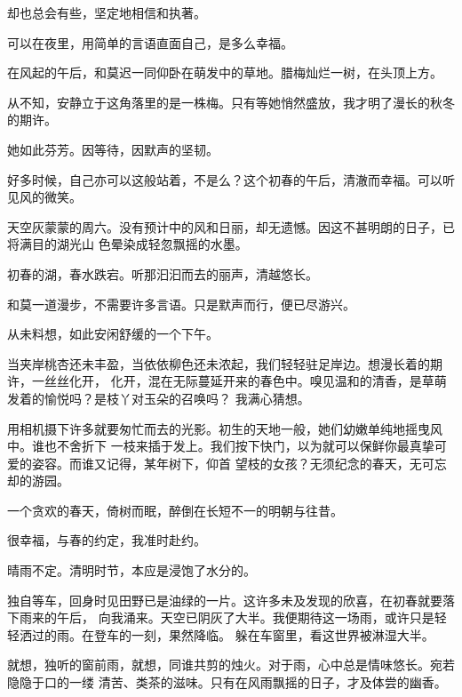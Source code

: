 		却也总会有些，坚定地相信和执著。

	\endwriting



		可以在夜里，用简单的言语直面自己，是多么幸福。

		在风起的午后，和莫迟一同仰卧在萌发中的草地。腊梅灿烂一树，在头顶上方。

		从不知，安静立于这角落里的是一株梅。只有等她悄然盛放，我才明了漫长的秋冬的期许。

		她如此芬芳。因等待，因默声的坚韧。

		好多时候，自己亦可以这般站着，不是么？这个初春的午后，清澈而幸福。可以听见风的微笑。

	\endwriting



		天空灰蒙蒙的周六。没有预计中的风和日丽，却无遗憾。因这不甚明朗的日子，已将满目的湖光山
	色晕染成轻忽飘摇的水墨。

		初春的湖，春水跌宕。听那汩汩而去的丽声，清越悠长。

		和莫一道漫步，不需要许多言语。只是默声而行，便已尽游兴。

		从未料想，如此安闲舒缓的一个下午。

		当夹岸桃杏还未丰盈，当依依柳色还未浓起，我们轻轻驻足岸边。想漫长着的期许，一丝丝化开，
	化开，混在无际蔓延开来的春色中。嗅见温和的清香，是草萌发着的愉悦吗？是枝丫对玉朵的召唤吗？
	我满心猜想。

		用相机摄下许多就要匆忙而去的光影。初生的天地一般，她们幼嫩单纯地摇曳风中。谁也不舍折下
	一枝来插于发上。我们按下快门，以为就可以保鲜你最真挚可爱的姿容。而谁又记得，某年树下，仰首
	望枝的女孩？无须纪念的春天，无可忘却的游园。

		一个贪欢的春天，倚树而眠，醉倒在长短不一的明朝与往昔。

		很幸福，与春的约定，我准时赴约。

	\endwriting


	\label{diary_20050404}

		晴雨不定。清明时节，本应是浸饱了水分的。

		独自等车，回身时见田野已是油绿的一片。这许多未及发现的欣喜，在初春就要落下雨来的午后，
	向我涌来。天空已阴灰了大半。我便期待这一场雨，或许只是轻轻洒过的雨。在登车的一刻，果然降临。
	躲在车窗里，看这世界被淋湿大半。

		就想，独听的窗前雨，就想，同谁共剪的烛火。对于雨，心中总是情味悠长。宛若隐隐于口的一缕
	清苦、类茶的滋味。只有在风雨飘摇的日子，才及体尝的幽香。

